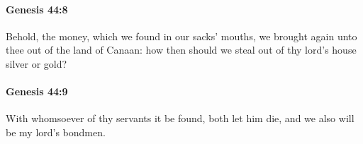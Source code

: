 		\paragraph{Genesis 44:8} %
			\label{GENESIS-44-8}

			Behold, the money, which we found in our sacks' mouths, we brought again unto thee out of the land of Canaan: how then should we steal out of thy lord's house silver or gold?


		\paragraph{Genesis 44:9} %
			\label{GENESIS-44-9}

			With whomsoever of thy servants it be found, both let him die, and we also will be my lord's bondmen.


